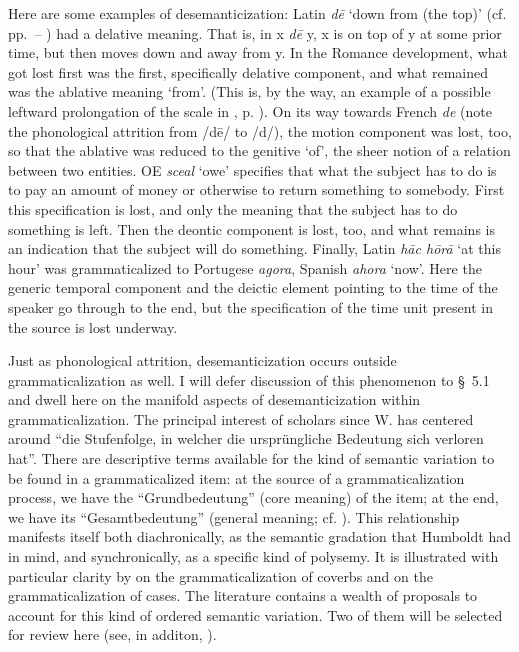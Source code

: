 Here are some examples of desemanticization: Latin \textit{d\=e} ‘down from (the top)’ (cf. pp.~\pageref{page78b}--\pageref{page79}\chk%
) had a delative meaning. That is, in x \textit{d\=e} y, x is on top of y at some prior time, but then moves down and away from y. In the Romance development, what got lost first was the first, specifically delative component, and what remained was the ablative meaning ‘from’. (This is, by the way, an example of a possible leftward prolongation of the scale in , p. \pageref{F8}). On its way towards French \textit{de} (note the phonological attrition from /d\=e/ to /d/), the motion component was lost, too, so that the ablative was reduced to the genitive ‘of’, the sheer notion of a relation between two entities. OE \textit{sceal} ‘owe’ specifies that what the subject has to do is to pay an amount of money or otherwise to return something to somebody. First this specification is lost, and only the meaning that the subject has to do something is left. Then the deontic component is lost, too, and what remains is an indication that the subject will do something. Finally, Latin \textit{h\=ac h\=or\=a} ‘at this hour’ was grammaticalized to Portugese \textit{agora}, Spanish \textit{ahora} ‘now’. Here the generic temporal component and the deictic element pointing to the time of the speaker go through to the end, but the specification of the time unit present in the source is lost underway.

Just as phonological attrition, desemanticization occurs outside grammaticalization as well. I will defer discussion of this phenomenon to §~5.1 and dwell here on the manifold aspects of desemanticization within grammaticalization. The principal interest of scholars since W. \citet[52]{Humboldt1822} has centered around “die Stufenfolge, in welcher die ursprüngliche Bedeutung sich verloren hat”.  There are descriptive terms available for the kind of semantic variation to be found in a grammaticalized item: at the source of a grammaticalization process, we have the ``Grundbedeutung'' (core meaning) of the item; at the end, we have its ``Gesamtbedeutung'' (general meaning; cf. \citealt{Jakobson1936}). This relationship manifests itself both diachronically, as the semantic gradation that Humboldt had in mind, and synchronically, as a specific kind of polysemy. It is illustrated with particular clarity by  on the grammaticalization of coverbs and  on the grammaticalization of cases. The literature contains a wealth of proposals to account for this kind of ordered semantic variation. Two of them will be selected for review here (see, in additon, \citealt{Traugott1980}).

